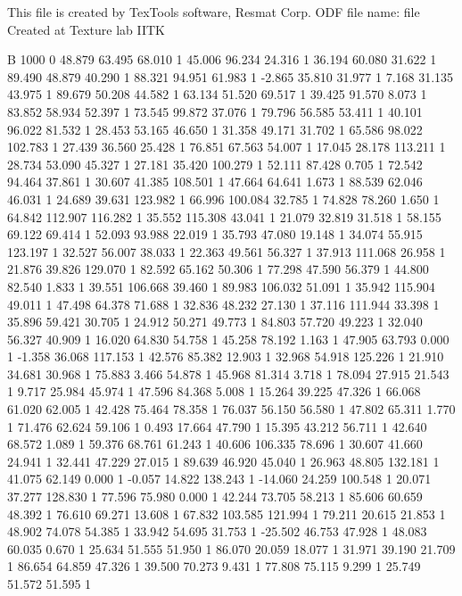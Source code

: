 This file is created by TexTools software, Resmat Corp.
ODF file name: file Created at Texture lab IITK

B 1000 0
	48.879 63.495 68.010 1
	45.006 96.234 24.316 1
	36.194 60.080 31.622 1
	89.490 48.879 40.290 1
	88.321 94.951 61.983 1
	-2.865 35.810 31.977 1
	7.168 31.135 43.975 1
	89.679 50.208 44.582 1
	63.134 51.520 69.517 1
	39.425 91.570 8.073 1
	83.852 58.934 52.397 1
	73.545 99.872 37.076 1
	79.796 56.585 53.411 1
	40.101 96.022 81.532 1
	28.453 53.165 46.650 1
	31.358 49.171 31.702 1
	65.586 98.022 102.783 1
	27.439 36.560 25.428 1
	76.851 67.563 54.007 1
	17.045 28.178 113.211 1
	28.734 53.090 45.327 1
	27.181 35.420 100.279 1
	52.111 87.428 0.705 1
	72.542 94.464 37.861 1
	30.607 41.385 108.501 1
	47.664 64.641 1.673 1
	88.539 62.046 46.031 1
	24.689 39.631 123.982 1
	66.996 100.084 32.785 1
	74.828 78.260 1.650 1
	64.842 112.907 116.282 1
	35.552 115.308 43.041 1
	21.079 32.819 31.518 1
	58.155 69.122 69.414 1
	52.093 93.988 22.019 1
	35.793 47.080 19.148 1
	34.074 55.915 123.197 1
	32.527 56.007 38.033 1
	22.363 49.561 56.327 1
	37.913 111.068 26.958 1
	21.876 39.826 129.070 1
	82.592 65.162 50.306 1
	77.298 47.590 56.379 1
	44.800 82.540 1.833 1
	39.551 106.668 39.460 1
	89.983 106.032 51.091 1
	35.942 115.904 49.011 1
	47.498 64.378 71.688 1
	32.836 48.232 27.130 1
	37.116 111.944 33.398 1
	35.896 59.421 30.705 1
	24.912 50.271 49.773 1
	84.803 57.720 49.223 1
	32.040 56.327 40.909 1
	16.020 64.830 54.758 1
	45.258 78.192 1.163 1
	47.905 63.793 0.000 1
	-1.358 36.068 117.153 1
	42.576 85.382 12.903 1
	32.968 54.918 125.226 1
	21.910 34.681 30.968 1
	75.883 3.466 54.878 1
	45.968 81.314 3.718 1
	78.094 27.915 21.543 1
	9.717 25.984 45.974 1
	47.596 84.368 5.008 1
	15.264 39.225 47.326 1
	66.068 61.020 62.005 1
	42.428 75.464 78.358 1
	76.037 56.150 56.580 1
	47.802 65.311 1.770 1
	71.476 62.624 59.106 1
	0.493 17.664 47.790 1
	15.395 43.212 56.711 1
	42.640 68.572 1.089 1
	59.376 68.761 61.243 1
	40.606 106.335 78.696 1
	30.607 41.660 24.941 1
	32.441 47.229 27.015 1
	89.639 46.920 45.040 1
	26.963 48.805 132.181 1
	41.075 62.149 0.000 1
	-0.057 14.822 138.243 1
	-14.060 24.259 100.548 1
	20.071 37.277 128.830 1
	77.596 75.980 0.000 1
	42.244 73.705 58.213 1
	85.606 60.659 48.392 1
	76.610 69.271 13.608 1
	67.832 103.585 121.994 1
	79.211 20.615 21.853 1
	48.902 74.078 54.385 1
	33.942 54.695 31.753 1
	-25.502 46.753 47.928 1
	48.083 60.035 0.670 1
	25.634 51.555 51.950 1
	86.070 20.059 18.077 1
	31.971 39.190 21.709 1
	86.654 64.859 47.326 1
	39.500 70.273 9.431 1
	77.808 75.115 9.299 1
	25.749 51.572 51.595 1
